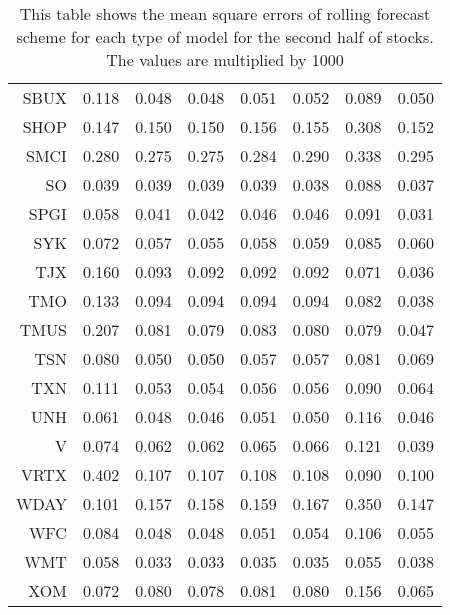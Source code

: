 \begin{table}[ht]
\begin{tabular}{rrrrrrrr}
  SBUX & 0.118 & 0.048 & 0.048 & 0.051 & 0.052 & 0.089 & 0.050 \\ 
  SHOP & 0.147 & 0.150 & 0.150 & 0.156 & 0.155 & 0.308 & 0.152 \\ 
  SMCI & 0.280 & 0.275 & 0.275 & 0.284 & 0.290 & 0.338 & 0.295 \\ 
  SO & 0.039 & 0.039 & 0.039 & 0.039 & 0.038 & 0.088 & 0.037 \\ 
  SPGI & 0.058 & 0.041 & 0.042 & 0.046 & 0.046 & 0.091 & 0.031 \\ 
  SYK & 0.072 & 0.057 & 0.055 & 0.058 & 0.059 & 0.085 & 0.060 \\ 
  TJX & 0.160 & 0.093 & 0.092 & 0.092 & 0.092 & 0.071 & 0.036 \\ 
  TMO & 0.133 & 0.094 & 0.094 & 0.094 & 0.094 & 0.082 & 0.038 \\ 
  TMUS & 0.207 & 0.081 & 0.079 & 0.083 & 0.080 & 0.079 & 0.047 \\ 
  TSN & 0.080 & 0.050 & 0.050 & 0.057 & 0.057 & 0.081 & 0.069 \\ 
  TXN & 0.111 & 0.053 & 0.054 & 0.056 & 0.056 & 0.090 & 0.064 \\ 
  UNH & 0.061 & 0.048 & 0.046 & 0.051 & 0.050 & 0.116 & 0.046 \\ 
  V & 0.074 & 0.062 & 0.062 & 0.065 & 0.066 & 0.121 & 0.039 \\ 
  VRTX & 0.402 & 0.107 & 0.107 & 0.108 & 0.108 & 0.090 & 0.100 \\ 
  WDAY & 0.101 & 0.157 & 0.158 & 0.159 & 0.167 & 0.350 & 0.147 \\ 
  WFC & 0.084 & 0.048 & 0.048 & 0.051 & 0.054 & 0.106 & 0.055 \\ 
  WMT & 0.058 & 0.033 & 0.033 & 0.035 & 0.035 & 0.055 & 0.038 \\ 
  XOM & 0.072 & 0.080 & 0.078 & 0.081 & 0.080 & 0.156 & 0.065 \\ 
   \hline
\end{tabular}
\caption[MSE rolling forecast (2)]{This table shows the mean square errors of rolling forecast scheme for each type of model for the second half of stocks. 
                     The values are multiplied by 1000} 
\label{Table:MSE_r_2}
\end{table}
